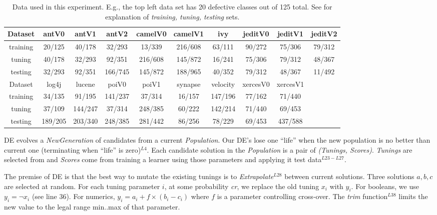  \begin{table*}[!t]

\renewcommand{\baselinestretch}{0.8}
\scriptsize
\centering
  \begin{tabular}{c c c c c c c c c c } \hline
  Dataset &antV0&antV1&antV2&camelV0&camelV1&ivy&jeditV0&jeditV1&jeditV2
\\\hline
  training &20/125 &40/178 &32/293 &13/339 &216/608 &63/111 &90/272 &75/306 &79/312
\\  tuning  &40/178 &32/293 &92/351 &216/608 &145/872 &16/241 &75/306 &79/312 &48/367
\\  testing &32/293 &92/351 &166/745 &145/872 &188/965 &40/352 &79/312 &48/367 &11/492
\\ \hline
  Dataset &log4j&lucene&poiV0&poiV1&synapse&velocity&xercesV0&xercesV1
\\\hline
  training &34/135 &91/195 &141/237 &37/314 &16/157 &147/196 &77/162 &71/440
\\  tuning  &37/109 &144/247 &37/314 &248/385 &60/222 &142/214 &71/440 &69/453
\\  testing &189/205 &203/340 &248/385 &281/442 &86/256 &78/229 &69/453 &437/588
\\  \end{tabular}

   \caption{Data used in this experiment. 
   E.g., the top left data set has 20 defective classes out of 125 total.
   See  for explanation of {\em training, tuning, testing} sets.
   }\label{tab:data1}
\end{table*} 

DE evolves a {\em NewGeneration} of candidates  from
a current {\em Population}.  Our DE's lose one ``life''
when the new population is no better than  current one (terminating when ``life'' is zero)$^{L4}$.
Each candidate solution in the {\em Population}  
is a pair of {\em (Tunings, Scores)}.  {\em Tunings} are selected from
 and {\em Scores} come from training a learner using those parameters
and applying it     test data$^{L23-L27}$.

The premise of DE  is that the best way to mutate the existing tunings
is to {\em Extrapolate}$^{L28}$
between current solutions.  Three solutions $a,b,c$ are selected at random.
For each tuning parameter $i$, at some probability {\em cr}, we replace
the old tuning $x_i$ with $y_i$. For booleans, we use $y_i= \neg x_i$ (see line 36). For numerics, $y_i = a_i+f \times (b_i - c_i)$   where $f$ is a parameter
controlling  cross-over.  The {\em trim} function$^{L38}$ limits the new
value to the legal range min..max of that parameter.
 
